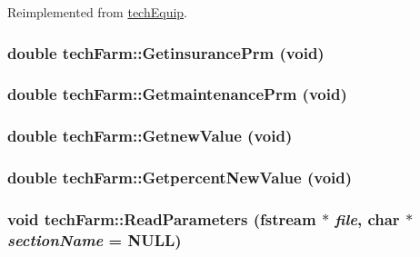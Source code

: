 Reimplemented from \hyperlink{classtech_equip_a3b755c4eb6c71bb00b3cf745cd2d3c19}{techEquip}.\hypertarget{classtech_farm_aec1e92fc836465da596ae5688a6c5609}{
\subsubsection[{GetinsurancePrm}]{\setlength{\rightskip}{0pt plus 5cm}double techFarm::GetinsurancePrm (void)}}
\label{classtech_farm_aec1e92fc836465da596ae5688a6c5609}
\hypertarget{classtech_farm_a6e04678c8e66f3e822a3e8b8a70f7294}{
\subsubsection[{GetmaintenancePrm}]{\setlength{\rightskip}{0pt plus 5cm}double techFarm::GetmaintenancePrm (void)}}
\label{classtech_farm_a6e04678c8e66f3e822a3e8b8a70f7294}
\hypertarget{classtech_farm_aff350591013d647ad68bd19b10b6cd12}{
\subsubsection[{GetnewValue}]{\setlength{\rightskip}{0pt plus 5cm}double techFarm::GetnewValue (void)}}
\label{classtech_farm_aff350591013d647ad68bd19b10b6cd12}
\hypertarget{classtech_farm_a1dadfab669ff7b46fb97a3b338120784}{
\subsubsection[{GetpercentNewValue}]{\setlength{\rightskip}{0pt plus 5cm}double techFarm::GetpercentNewValue (void)}}
\label{classtech_farm_a1dadfab669ff7b46fb97a3b338120784}
\hypertarget{classtech_farm_aa64882b3e2248295d793274f75795707}{
\subsubsection[{ReadParameters}]{\setlength{\rightskip}{0pt plus 5cm}void techFarm::ReadParameters (fstream $\ast$ {\em file}, \/  char $\ast$ {\em sectionName} = {\ttfamily NULL})}}
\label{classtech_farm_aa64882b3e2248295d793274f75795707}


